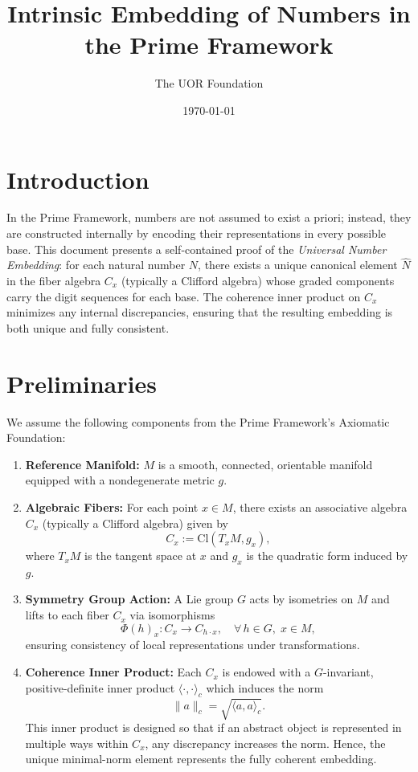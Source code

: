 \documentclass[12pt]{article}
\title{Intrinsic Embedding of Numbers in the Prime Framework}
\author{The UOR Foundation}
\date{\today}
\begin{document}
\maketitle

\section{Introduction}
In the Prime Framework, numbers are not assumed to exist a priori; instead, they are constructed internally by encoding their representations in every possible base. This document presents a self-contained proof of the \emph{Universal Number Embedding}: for each natural number \(N\), there exists a unique canonical element \(\hat{N}\) in the fiber algebra \(C_x\) (typically a Clifford algebra) whose graded components carry the digit sequences for each base. The coherence inner product on \(C_x\) minimizes any internal discrepancies, ensuring that the resulting embedding is both unique and fully consistent.

\section{Preliminaries}
We assume the following components from the Prime Framework's Axiomatic Foundation:
\begin{enumerate}
  \item \textbf{Reference Manifold:} \(M\) is a smooth, connected, orientable manifold equipped with a nondegenerate metric \(g\).
  \item \textbf{Algebraic Fibers:} For each point \(x\in M\), there exists an associative algebra \(C_x\) (typically a Clifford algebra) given by
  \[
  C_x := \mathrm{Cl}(T_xM, g_x),
  \]
  where \(T_xM\) is the tangent space at \(x\) and \(g_x\) is the quadratic form induced by \(g\).
  \item \textbf{Symmetry Group Action:} A Lie group \(G\) acts by isometries on \(M\) and lifts to each fiber \(C_x\) via isomorphisms
  \[
  \Phi(h)_x : C_x \to C_{h\cdot x}, \quad \forall\, h\in G,\; x\in M,
  \]
  ensuring consistency of local representations under transformations.
  \item \textbf{Coherence Inner Product:} Each \(C_x\) is endowed with a \(G\)-invariant, positive-definite inner product \(\langle \cdot,\cdot\rangle_c\) which induces the norm
  \[
  \|a\|_c = \sqrt{\langle a,a \rangle_c}.
  \]
  This inner product is designed so that if an abstract object is represented in multiple ways within \(C_x\), any discrepancy increases the norm. Hence, the unique minimal-norm element represents the fully coherent embedding.
\end{enumerate}
\end{document}
